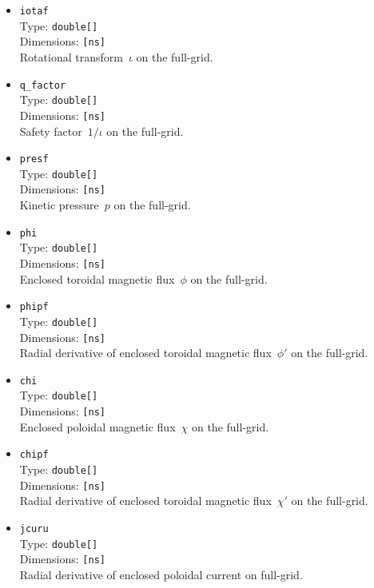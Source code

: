 \begin{itemize}
 \item \texttt{iotaf} \\
       Type: \texttt{double[]} \\
       Dimensions: \texttt{[ns]} \\
       Rotational transform~$\iota$ on the full-grid.
 \item \texttt{q\_factor} \\
       Type: \texttt{double[]} \\
       Dimensions: \texttt{[ns]} \\
       Safety factor~$1/\iota$ on the full-grid.
 \item \texttt{presf} \\
       Type: \texttt{double[]} \\
       Dimensions: \texttt{[ns]} \\
       Kinetic pressure~$p$ on the full-grid.
 \item \texttt{phi} \\
       Type: \texttt{double[]} \\
       Dimensions: \texttt{[ns]} \\
       Enclosed toroidal magnetic flux~$\phi$ on the full-grid.
 \item \texttt{phipf} \\
       Type: \texttt{double[]} \\
       Dimensions: \texttt{[ns]} \\
       Radial derivative of enclosed toroidal magnetic flux~$\phi'$ on the full-grid.
 \item \texttt{chi} \\
       Type: \texttt{double[]} \\
       Dimensions: \texttt{[ns]} \\
       Enclosed poloidal magnetic flux~$\chi$ on the full-grid.
 \item \texttt{chipf} \\
       Type: \texttt{double[]} \\
       Dimensions: \texttt{[ns]} \\
       Radial derivative of enclosed toroidal magnetic flux~$\chi'$ on the full-grid.
 \item \texttt{jcuru} \\
       Type: \texttt{double[]} \\
       Dimensions: \texttt{[ns]} \\
       Radial derivative of enclosed poloidal current on full-grid.

\end{itemize}
